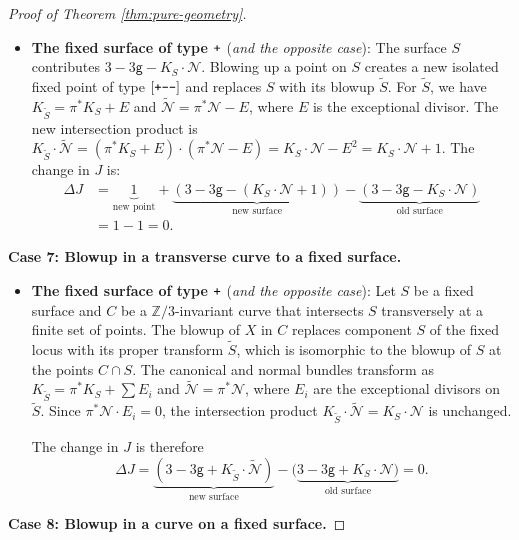 \documentclass[12pt,a4paper]{amsart}
\theoremstyle{definition}
\theoremstyle{remark}
\newcommand{\Z}{\mathbb{Z}}
\newcommand{\lp}{\textup{\texttt{+}}}
\newcommand{\lm}{\textup{\texttt{-}}}
\begin{document}
\begin{proof}[Proof of Theorem \ref{thm:pure-geometry}]
\begin{itemize}
    \item \textbf{The fixed surface of type $\lp$} (\textit{and the opposite case}):  The surface $S$ contributes $3 - 3\mathsf{g} - K_S \cdot \mathcal{N}$. Blowing up a point on $S$ creates a new isolated fixed point of type $[\lp\lm\lm]$ and replaces $S$ with its blowup $\widetilde{S}$. For $\widetilde{S}$, we have $K_{\widetilde{S}} = \pi^{\ast}K_S + E$ and $\widetilde{\mathcal{N}} = \pi^{\ast}\mathcal{N} - E$, where $E$ is the exceptional divisor. The new intersection product is $K_{\widetilde{S}} \cdot \widetilde{\mathcal{N}} = (\pi^{\ast}K_S + E) \cdot (\pi^{\ast}\mathcal{N} - E) = K_S \cdot \mathcal{N} - E^2 = K_S \cdot \mathcal{N} + 1$. The change in $J$ is:
    \begin{align}
        \Delta J &= \underbrace{1}_{\text{new point}} + \underbrace{(3 - 3\mathsf{g} - (K_S\cdot\mathcal{N} + 1))}_{\text{new surface}} - \underbrace{(3 - 3\mathsf{g} - K_S\cdot\mathcal{N})}_{\text{old surface}} \\
        &= 1 - 1 = 0.
    \end{align}
\end{itemize}

\noindent \textbf{Case 7: Blowup in a transverse curve to a fixed surface.}
\begin{itemize}
    \item  \textbf{The fixed surface of type $\lp$} (\textit{and the opposite case}): Let $S$ be a fixed surface and $C$ be a $\Z/3$-invariant curve that intersects $S$ transversely at a finite set of points.  The blowup of $X$ in $C$ replaces component $S$ of the fixed locus with its proper transform $\widetilde{S}$, which is isomorphic to the blowup of $S$ at the points $C \cap S$. The canonical and normal bundles transform as $K_{\widetilde{S}} = \pi^{\ast}K_S + \sum E_i$ and $\widetilde{\mathcal{N}} = \pi^{\ast}\mathcal{N}$, where $E_i$ are the exceptional divisors on $\widetilde{S}$. Since $\pi^{\ast}\mathcal{N} \cdot E_i = 0$, the intersection product $K_{\widetilde{S}}\cdot\widetilde{\mathcal{N}} = K_S\cdot\mathcal{N}$ is unchanged. 
    
    The change in $J$ is therefore $$\Delta J = \underbrace{(3-3\mathsf g +K_{\widetilde S}\cdot \widetilde{\mathcal N} )}_{\text{new surface}} -   (\underbrace{3-3\mathsf g +K_{S}\cdot \mathcal N)}_{\text{old surface}}= 0.$$
\end{itemize}

\noindent \textbf{Case 8: Blowup in a curve on a fixed surface.}


\end{proof}
\end{document}
